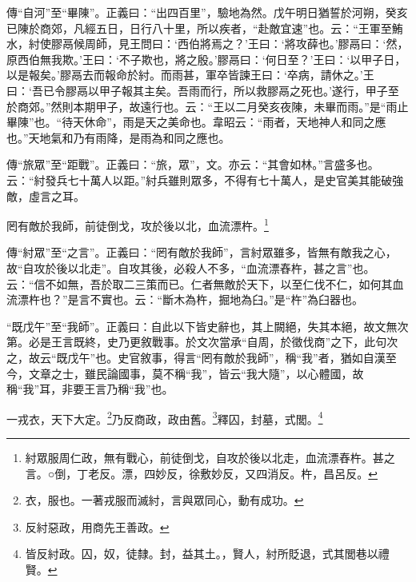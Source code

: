 {\noindent\zhuan{}\fzbyks 傳“自河”至“畢陳”。正義曰：“出四百里”，驗地為然。戊午明日猶誓於河朔，癸亥已陳於商郊，凡經五日，日行八十里，所以疾者，“赴敵宜速”也。云：“王軍至鮪水，紂使膠鬲候周師，見王問曰：‘西伯將焉之？’王曰：‘將攻薛也。’膠鬲曰：‘然，原西伯無我欺。’王曰：‘不子欺也，將之殷。’膠鬲曰：‘何日至？’王曰：‘以甲子日，以是報矣。’膠鬲去而報命於紂。而雨甚，軍卒皆諫王曰：‘卒病，請休之。’王曰：‘吾已令膠鬲以甲子報其主矣。吾雨而行，所以救膠鬲之死也。’遂行，甲子至於商郊。”然則本期甲子，故遠行也。云：“王以二月癸亥夜陳，未畢而雨。”是“雨止畢陳”也。“待天休命”，雨是天之美命也。韋昭云：“雨者，天地神人和同之應也。”天地氣和乃有雨降，是雨為和同之應也。 \par}

{\noindent\zhuan{}\fzbyks 傳“旅眾”至“距戰”。正義曰：“旅，眾”，文。亦云：“其會如林。”言盛多也。云：“紂發兵七十萬人以距。”紂兵雖則眾多，不得有七十萬人，是史官美其能破強敵，虛言之耳。 \par}

罔有敵於我師，前徒倒戈，攻於後以北，血流漂杵。\footnote{紂眾服周仁政，無有戰心，前徒倒戈，自攻於後以北走，血流漂舂杵。甚之言。○倒，丁老反。漂，四妙反，徐敷妙反，又四消反。杵，昌呂反。}

{\noindent\zhuan{}\fzbyks 傳“紂眾”至“之言”。正義曰：“罔有敵於我師”，言紂眾雖多，皆無有敵我之心，故“自攻於後以北走”。自攻其後，必殺人不多，“血流漂舂杵，甚之言”也。云：“信不如無，吾於取二三策而已。仁者無敵於天下，以至仁伐不仁，如何其血流漂杵也？”是言不實也。云：“斷木為杵，掘地為臼。”是“杵”為臼器也。 \par}

{\noindent\shu{}\fzkt “既戊午”至“我師”。正義曰：自此以下皆史辭也，其上闕絕，失其本絕，故文無次第。必是王言既終，史乃更敘戰事。於文次當承“自周，於徵伐商”之下，此句次之，故云“既戊午”也。史官敘事，得言“罔有敵於我師”，稱“我”者，猶如自漢至今，文章之士，雖民論國事，莫不稱“我”，皆云“我大隨”，以心體國，故稱“我”耳，非要王言乃稱“我”也。 \par}

一戎衣，天下大定。\footnote{衣，服也。一著戎服而滅紂，言與眾同心，動有成功。}乃反商政，政由舊。\footnote{反紂惡政，用商先王善政。}釋囚，封墓，式閭。\footnote{皆反紂政。囚，奴，徒隸。封，益其土。，賢人，紂所貶退，式其閭巷以禮賢。}

